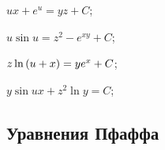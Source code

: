 \begin{enumsols}
		\label{sol:nonlinsys_partialsyst:systems3hard}
		\item \( ux + e^u = yz + C \); \sfill %
		\item \( u \sin{u} = z^2 - e^{xy} + C \); \sfill %
		\item \( z \ln\left( u + x \right) = ye^x + C \); \sfill %
		\item \( y \sin{ux} + z^2 \ln{y} = C \); \sfill %

	\end{enumsols}


\subsection*{Уравнения Пфаффа}

